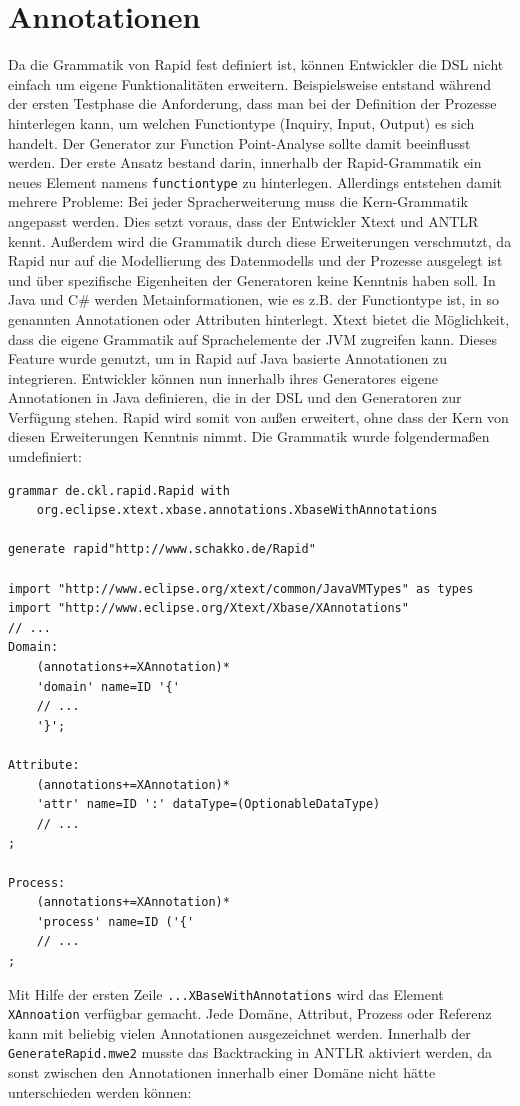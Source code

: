 \documentclass[a4paper,12pt]{scrreprt}
\begin{document}
\section{Annotationen}
Da die Grammatik von Rapid fest definiert ist, können Entwickler die DSL nicht einfach um eigene Funktionalitäten erweitern. Beispielsweise entstand während der ersten Testphase die Anforderung, dass man bei der Definition der Prozesse hinterlegen kann, um welchen Functiontype (Inquiry, Input, Output) es sich handelt. Der Generator zur Function Point-Analyse sollte damit beeinflusst werden.
Der erste Ansatz bestand darin, innerhalb der Rapid-Grammatik ein neues Element namens \texttt{functiontype} zu hinterlegen.
Allerdings entstehen damit mehrere Probleme: Bei jeder Spracherweiterung muss die Kern-Grammatik angepasst werden. Dies setzt voraus, dass der Entwickler Xtext und ANTLR kennt. Außerdem wird die Grammatik durch diese Erweiterungen verschmutzt, da Rapid nur auf die Modellierung des Datenmodells und der Prozesse ausgelegt ist und über spezifische Eigenheiten der Generatoren keine Kenntnis haben soll.
In Java und C\# werden Metainformationen, wie es z.B. der Functiontype ist, in so genannten Annotationen \cite{annotations} oder Attributen \cite{attributes} hinterlegt. Xtext bietet die Möglichkeit, dass die eigene Grammatik auf Sprachelemente der JVM zugreifen kann. Dieses Feature wurde genutzt, um in Rapid auf Java basierte Annotationen zu integrieren. Entwickler können nun innerhalb ihres Generatores eigene Annotationen in Java definieren, die in der DSL und den Generatoren zur Verfügung stehen. Rapid wird somit von außen erweitert, ohne dass der Kern von diesen Erweiterungen Kenntnis nimmt.
Die Grammatik wurde folgendermaßen umdefiniert:
\begin{verbatim}
grammar de.ckl.rapid.Rapid with 
    org.eclipse.xtext.xbase.annotations.XbaseWithAnnotations

generate rapid"http://www.schakko.de/Rapid"
 
import "http://www.eclipse.org/xtext/common/JavaVMTypes" as types
import "http://www.eclipse.org/Xtext/Xbase/XAnnotations"
// ...
Domain:
    (annotations+=XAnnotation)*
    'domain' name=ID '{'
    // ...
    '}';
	
Attribute:
    (annotations+=XAnnotation)*
    'attr' name=ID ':' dataType=(OptionableDataType)
    // ...
;

Process:
    (annotations+=XAnnotation)*
    'process' name=ID ('{'
    // ...
;	
\end{verbatim}
Mit Hilfe der ersten Zeile \verb+...XBaseWithAnnotations+ wird das Element \verb+XAnnoation+ verfügbar gemacht. Jede Domäne, Attribut, Prozess oder Referenz kann mit beliebig vielen Annotationen ausgezeichnet werden. Innerhalb der \verb+GenerateRapid.mwe2+ musste das Backtracking in ANTLR aktiviert werden, da sonst zwischen den Annotationen innerhalb einer Domäne nicht hätte unterschieden werden können:
\end{document}
